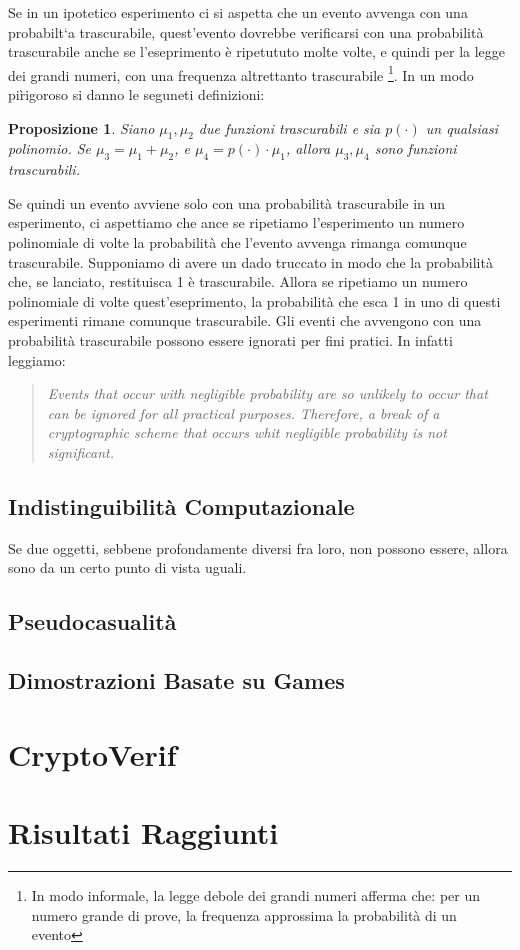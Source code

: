 \documentclass[a4paper,openright,twoside,12pt]{report}
\newtheorem{proposizione}{Proposizione}[chapter]
\begin{document}
Se in un ipotetico esperimento ci si aspetta che un evento avvenga con una probabilt`a trascurabile,
quest'evento dovrebbe verificarsi con una probabilit\`a trascurabile anche se l'eseprimento \`e ripetututo molte volte, e quindi per la legge dei grandi numeri, 
con una frequenza altrettanto trascurabile
\footnote{In modo informale, la legge debole dei grandi numeri afferma che: per un numero grande di prove, 
la frequenza approssima la probabilit\`a di un evento}. 
In un modo pi\`rigoroso si danno le seguneti definizioni:
\begin{proposizione}
Siano $\mu_1, \mu_2$ due funzioni trascurabili e sia $p(\cdot)$ un qualsiasi polinomio. Se $\mu_3 = \mu_1 + \mu_2$, e $\mu_4= p(\cdot)\cdot \mu_1$, allora $\mu_3, \mu_4$ sono funzioni trascurabili.  
\end{proposizione} 

Se quindi un evento avviene solo con una probabilit\`a trascurabile in un esperimento, ci aspettiamo che ance se ripetiamo l'esperimento un numero polinomiale di volte la probabilit\`a che l'evento avvenga 
rimanga comunque trascurabile. 
Supponiamo di avere un dado truccato in modo che la probabilit\`a che, se lanciato, restituisca 1 \`e trascurabile. Allora se ripetiamo un numero polinomiale di volte quest'eseprimento, la probabilit\`a
che esca 1 in uno di questi esperimenti rimane comunque trascurabile.
Gli eventi che avvengono con una probabilit\`a trascurabile possono essere ignorati per fini pratici.
In \cite{1206501} infatti leggiamo:
\begin{quotation}
\emph{Events that occur with negligible probability are so unlikely to occur that can be ignored for all practical purposes. Therefore,
a break of a cryptographic scheme that occurs whit negligible probability is not significant.}
\end{quotation}
\newpage


\section{Indistinguibilit\`a Computazionale}
Se due oggetti, sebbene profondamente diversi fra loro, non possono essere, allora sono da un certo punto di vista uguali.

\section{Pseudocasualit\`a}

\section{Dimostrazioni Basate su Games}

\chapter{CryptoVerif}

\chapter{Risultati Raggiunti}

\lhead[\fancyplain{}{\bfseries\thepage}]{\fancyplain{}{\bfseries\rightmark}}
	
		
\end{document}
